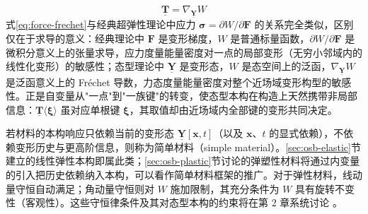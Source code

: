 \begin{equation}
  \underline{\mathbf{T}}=\nabla_{\underline{\mathbf{Y}}}W
  \label{eq:force-frechet}
\end{equation}
式\eqref{eq:force-frechet}与经典超弹性理论中应力 $\boldsymbol{\sigma}=\partial W/\partial\mathbf{F}$ 的关系完全类似，区别仅在于求导的意义：经典理论中 $\mathbf{F}$ 是变形梯度，$W$ 是普通标量函数，$\partial W/\partial\mathbf{F}$ 是微积分意义上的张量求导，应力度量能量密度对一点的局部变形（无穷小邻域内的线性化变形）的敏感性；态型理论中 $\underline{\mathbf{Y}}$ 是变形态，$W$ 是态空间上的泛函，$\nabla_{\underline{\mathbf{Y}}}W$ 是泛函意义上的 Fréchet 导数，力态度量能量密度对整个近场域变形构型的敏感性。正是自变量从"一点"到"一族键"的转变，使态型本构在构造上天然携带非局部信息：$\underline{\mathbf{T}}\langle\boldsymbol{\xi}\rangle$ 虽对应单根键 $\boldsymbol{\xi}$，其取值却由近场域内全部键的变形共同决定。

若材料的本构响应只依赖当前的变形态 $\underline{\mathbf{Y}}[\mathbf{x},t]$（以及 $\mathbf{x}$、$t$ 的显式依赖），不依赖变形历史与更高阶信息，则称为简单材料（simple material）\cite{Silling2007}。\ref{sec:osb-elastic}节建立的线性弹性本构即属此类；\ref{sec:osb-plastic}节讨论的弹塑性材料将通过内变量的引入把历史依赖纳入本构，可以看作简单材料框架的推广。对于弹性材料，线动量守恒自动满足；角动量守恒则对 $W$ 施加限制，其充分条件为 $W$ 具有旋转不变性（客观性）。这些守恒律条件及其对态型本构的约束将在第 2 章系统讨论 \cite{Silling2007,SillingLehoucq2010}。

